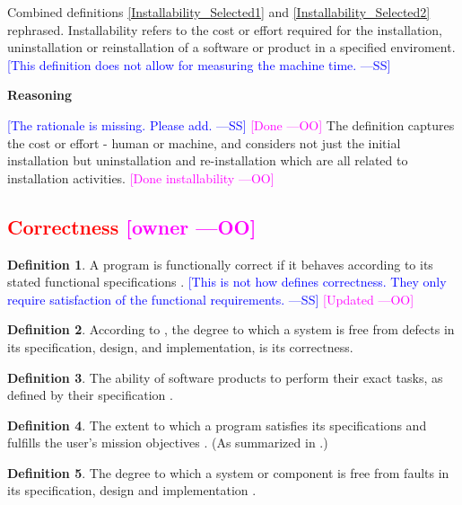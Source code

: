 \documentclass[letterpaper,cleveref]{lipics-v2019}
\newcommand{\authornote}[3]{\textcolor{#1}{[#3 ---#2]}}
\newcommand{\authornote}[3]{}
\newcommand{\wss}[1]{\authornote{blue}{SS}{#1}} %
\newcommand{\oo}[1]{\authornote{magenta}{OO}{#1}} %
\newcommand{\notdone}[1]{\textcolor{red}{#1}}
\theoremstyle{definition}
\newtheorem{defn}{Definition}
\begin{document}
Combined definitions \ref{Installability_Selected1} and
\ref{Installability_Selected2} rephrased.
Installability refers to the cost or effort required for the installation,
uninstallation or reinstallation of a software or product in a specified
enviroment.  \wss{This definition does not allow for
	measuring the machine time.}

\noindent \textbf{Reasoning}

\wss{The rationale is missing.  Please add.} \oo{Done}
The definition captures the cost or effort - human or machine, and considers not just the initial installation but uninstallation and re-installation which are all related to installation activities.
\oo{Done installability}
\subsection{\notdone{Correctness} \oo{owner}}

\begin{defn}  
	A program is functionally correct if it behaves according to its stated
   functional specifications \citep{GhezziEtAl2003}.  \wss{This is not how
		\citet{GhezziEtAl2003} defines correctness.  They only require satisfaction
		of the functional requirements.} \oo{Updated}
	
\end{defn}

\begin{defn}
	According to \citet{wilson2009quality}, the degree to which a system is free
	from defects in its specification, design, and implementation, is its
	correctness.
\end{defn}

\begin{defn}
	The ability of software products to perform their exact tasks, as defined by
	their specification \citep{meyer1988object}.
\end{defn}

\begin{defn} 
	The extent to which a program satisfies its specifications and fulfills the
	user's mission objectives \citep{McCallEtAl1977}. (As summarized in
	\citet{VanVliet2000}.)
\end{defn}

\begin{defn} \label{Correctness_Selected}
 The degree to which a system or component is free from faults in its specification, design and implementation \citep{IEEEComputerDictionary1991}.
\end{defn}
\end{document}
